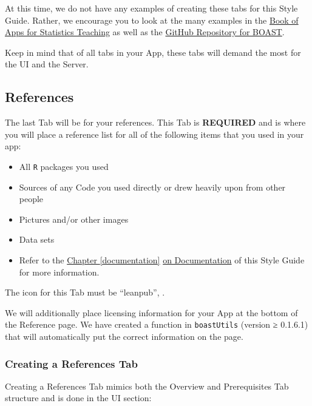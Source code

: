 \documentclass[
]{book}
\providecommand{\tightlist}{%
  \setlength{\itemsep}{0pt}\setlength{\parskip}{0pt}}
\begin{document}
At this time, we do not have any examples of creating these tabs for this Style Guide. Rather, we encourage you to look at the many examples in the \href{https://sites.psu.edu/shinyapps/}{Book of Apps for Statistics Teaching} as well as the \href{https://github.com/EducationShinyAppTeam}{GitHub Repository for BOAST}.

Keep in mind that of all tabs in your App, these tabs will demand the most for the UI and the Server.

\hypertarget{refTabb}{%
\subsection{References}\label{refTabb}}

The last Tab will be for your references. This Tab is \textbf{REQUIRED} and is where you will place a reference list for all of the following items that you used in your app:

\begin{itemize}
\tightlist
\item
  All \texttt{R} packages you used
\item
  Sources of any Code you used directly or drew heavily upon from other people
\item
  Pictures and/or other images
\item
  Data sets
\item
  Refer to the \protect\hyperlink{documentation}{Chapter \ref{documentation}} \protect\hyperlink{documentation}{on Documentation} of this Style Guide for more information.
\end{itemize}

The icon for this Tab must be ``leanpub'', .

We will additionally place licensing information for your App at the bottom of the Reference page. We have created a function in \texttt{boastUtils} (version ≥ 0.1.6.1) that will automatically put the correct information on the page.

\hypertarget{creating-a-references-tab-1}{%
\subsubsection{Creating a References Tab}\label{creating-a-references-tab-1}}

Creating a References Tab mimics both the Overview and Prerequisites Tab structure and is done in the UI section:
\end{document}
